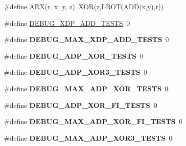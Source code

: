 \begin{DoxyCompactItemize}
\item 
\#define \hyperlink{common_8hh_a7d3da57c58af293c7c57e4f1b551849d}{\-A\-R\-X}(r, x, y, z)~\hyperlink{common_8hh_a6de9ec3b3b57377b69a82239ea52ec6e}{\-X\-O\-R}(z,\hyperlink{common_8hh_abe2030c44a97657e1b1dbe9b0e093a7b}{\-L\-R\-O\-T}(\hyperlink{common_8hh_af3b709fb668cf93ca09e2a46a2a031a8}{\-A\-D\-D}(x,y),r))
\item 
\#define \hyperlink{common_8hh_a78d7cffaa3259f513e5e7bcd9d669da7}{\-D\-E\-B\-U\-G\-\_\-\-X\-D\-P\-\_\-\-A\-D\-D\-\_\-\-T\-E\-S\-T\-S}~0
\item 
\hypertarget{common_8hh_a579e4a8212a42a313ee9ed7bcd8a9ce5}{\#define {\bfseries \-D\-E\-B\-U\-G\-\_\-\-M\-A\-X\-\_\-\-X\-D\-P\-\_\-\-A\-D\-D\-\_\-\-T\-E\-S\-T\-S}~0}\label{common_8hh_a579e4a8212a42a313ee9ed7bcd8a9ce5}

\item 
\hypertarget{common_8hh_ab47f232ba637e5c2b5dc0668d4057c3f}{\#define {\bfseries \-D\-E\-B\-U\-G\-\_\-\-A\-D\-P\-\_\-\-X\-O\-R\-\_\-\-T\-E\-S\-T\-S}~0}\label{common_8hh_ab47f232ba637e5c2b5dc0668d4057c3f}

\item 
\hypertarget{common_8hh_a6a3b53fb53389487441597ff95eca296}{\#define {\bfseries \-D\-E\-B\-U\-G\-\_\-\-A\-D\-P\-\_\-\-X\-O\-R3\-\_\-\-T\-E\-S\-T\-S}~0}\label{common_8hh_a6a3b53fb53389487441597ff95eca296}

\item 
\hypertarget{common_8hh_a39bde66f3dff0556be67eabc937c25f2}{\#define {\bfseries \-D\-E\-B\-U\-G\-\_\-\-M\-A\-X\-\_\-\-A\-D\-P\-\_\-\-X\-O\-R\-\_\-\-T\-E\-S\-T\-S}~0}\label{common_8hh_a39bde66f3dff0556be67eabc937c25f2}

\item 
\hypertarget{common_8hh_aacbf00f403fa45b41de86d28e9c6ed11}{\#define {\bfseries \-D\-E\-B\-U\-G\-\_\-\-A\-D\-P\-\_\-\-X\-O\-R\-\_\-\-F\-I\-\_\-\-T\-E\-S\-T\-S}~0}\label{common_8hh_aacbf00f403fa45b41de86d28e9c6ed11}

\item 
\hypertarget{common_8hh_a6c7a3b66985daa5b673fbbc628c247e8}{\#define {\bfseries \-D\-E\-B\-U\-G\-\_\-\-M\-A\-X\-\_\-\-A\-D\-P\-\_\-\-X\-O\-R\-\_\-\-F\-I\-\_\-\-T\-E\-S\-T\-S}~0}\label{common_8hh_a6c7a3b66985daa5b673fbbc628c247e8}

\item 
\hypertarget{common_8hh_ab7b86968b52634ad380013bc37e6318c}{\#define {\bfseries \-D\-E\-B\-U\-G\-\_\-\-M\-A\-X\-\_\-\-A\-D\-P\-\_\-\-X\-O\-R3\-\_\-\-T\-E\-S\-T\-S}~0}\label{common_8hh_ab7b86968b52634ad380013bc37e6318c}


\end{DoxyCompactItemize}
